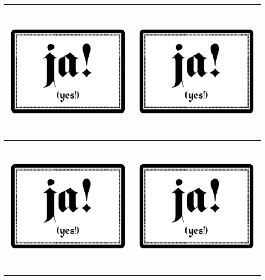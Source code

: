 \documentclass[12pt,a4paper,spanish]{article}
\begin{document}
\begin{table}
\begin{tabular}{|c|c|}
			\midrule
				\includegraphics[height=6.74cm]{./Drawings/ja!.pdf} &
				\includegraphics[height=6.74cm]{./Drawings/ja!.pdf} \\
			\midrule
				\includegraphics[height=6.74cm]{./Drawings/ja!.pdf} &
				\includegraphics[height=6.74cm]{./Drawings/ja!.pdf} \\
			\bottomrule
		\end{tabular}
	\end{table}
\end{document}
